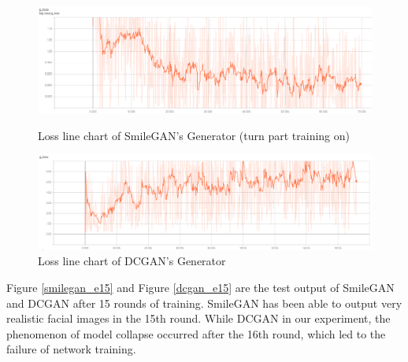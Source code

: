 \begin{figure}
    \begin{minipage}[t]{0.49\linewidth}
        \centering
        \includegraphics[width=\textwidth]{figures/loss_part_on_g.png}
        \caption{Loss line chart of SmileGAN's Generator (turn part training on)}
        \label{loss_part_on_g}
    \end{minipage}
        \hfill
    \begin{minipage}[t]{0.49\linewidth}
        \centering
        \includegraphics[width=\textwidth]{figures/loss_dcgan_g.png}
        \caption{Loss line chart of DCGAN's Generator}
        \label{loss_dcgan_g}
    \end{minipage}
\end{figure}

Figure \ref{smilegan_e15} and Figure \ref{dcgan_e15} are the test output of SmileGAN and DCGAN after 15 rounds of training.
SmileGAN has been able to output very realistic facial images in the 15th round.
While DCGAN in our experiment, the phenomenon of model collapse occurred after the 16th round, which led to the failure of network training.

